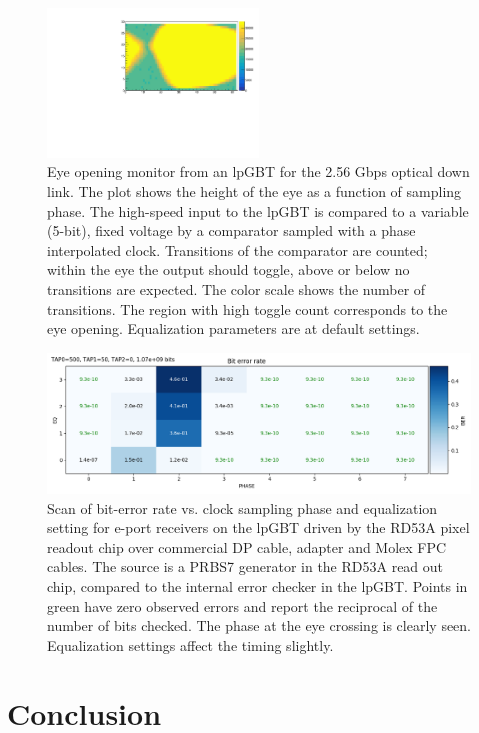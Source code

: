 \documentclass[a4paper,11pt]{article}
\begin{document}
\begin{figure}[htbp]
\centering
\includegraphics[width=0.5\textwidth,origin=c]{../figures/lpGBT_eye.pdf}
\caption{
\label{fig:lpgbt_eye}
Eye opening monitor from an lpGBT for the 2.56 Gbps optical down link.
The plot shows the height of the eye as a function of sampling phase.
The high-speed input to the lpGBT is compared to a variable (5-bit), fixed voltage by a comparator sampled with a phase interpolated clock.
Transitions of the comparator are counted; within the eye the output should toggle, above or below no transitions are expected.
The color scale shows the number of transitions.
The region with high toggle count corresponds to the eye opening.
Equalization parameters are at default settings.
}
\end{figure}

\begin{figure}[htbp]
\centering
\includegraphics[width=1.0\textwidth,origin=c]{../figures/lpGBT_bert.png}
\caption{
\label{fig:lpgbt_bert}
Scan of bit-error rate vs. clock sampling phase and equalization setting for e-port receivers on the lpGBT driven by the RD53A pixel readout chip over commercial DP cable, adapter and Molex FPC cables.
The source is a PRBS7 generator in the RD53A read out chip, compared to the internal error checker in the lpGBT.
Points in green have zero observed errors and report the reciprocal of the number of bits checked.
The phase at the eye crossing is clearly seen.
Equalization settings affect the timing slightly.
}
\end{figure}

\section{Conclusion}
\label{sec:conclusion}
\end{document}
